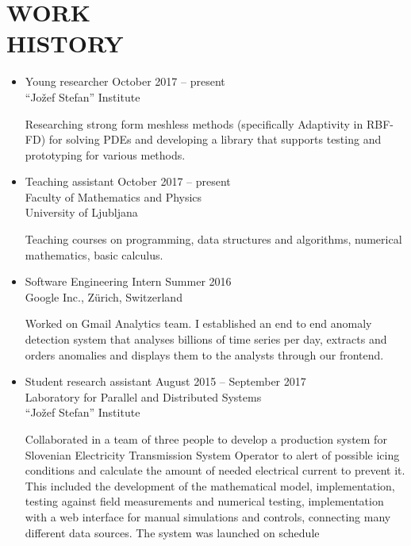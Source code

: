 \documentclass[line,margin]{res}
\newcommand{\wmeta}[1]{\sf#1\rm}
\newcommand{\wdesc}[1]{

#1

\vspace{6pt}}
\begin{document}
\section{WORK \\ HISTORY}
\begin{itemize}
  \item \wmeta{Young researcher \hfill October 2017 -- present \\
    \hspace*{\fill} ``Jožef Stefan'' Institute}
  \wdesc{Researching strong form meshless methods (specifically Adaptivity in RBF-FD) for solving PDEs 
    and developing a library that supports testing and prototyping for various methods.}
  \item \wmeta{Teaching assistant \hfill October 2017 -- present \\
    \hspace*{\fill}  Faculty of Mathematics and Physics \\
    \hspace*{\fill} University of Ljubljana}
  \wdesc{Teaching courses on programming, data structures and algorithms,
    numerical mathematics, basic calculus.}
  \item \wmeta{Software Engineering Intern \hfill Summer 2016 \\
    \hspace*{\fill} Google Inc., Z\"urich, Switzerland}
  \wdesc{Worked on Gmail Analytics team. I established an end to end anomaly
    detection system that analyses billions of time series per day, extracts and
    orders anomalies and displays them to the analysts through our frontend.}
  \item \wmeta{Student research assistant \hfill August 2015 -- September 2017 \\
    \hspace*{\fill} Laboratory for Parallel and Distributed Systems \\
    \hspace*{\fill} ``Jožef Stefan'' Institute}
  \wdesc{Collaborated in a team of three people to develop a production system
    for Slovenian Electricity Transmission System Operator to alert of possible
    icing conditions and calculate the amount of needed electrical current to
    prevent it. This included the development of the mathematical model,
    implementation, testing against field measurements and numerical testing,
    implementation with a web interface for manual simulations and controls,
    connecting many different data sources. The system was launched on schedule
}
\end{itemize}
\end{document}
